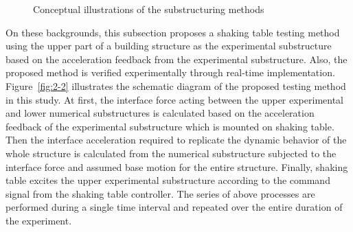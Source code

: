 \begin{figure}[ht]
\centering



\label{fig:2-1}
\caption{Conceptual illustrations of the substructuring methods}
\end{figure}

On these backgrounds, this subsection proposes a shaking table testing method using the upper part of a building structure as the experimental substructure based on the acceleration feedback from the experimental substructure. Also, the proposed method is verified experimentally through real-time implementation. Figure~\ref{fig:2-2} illustrates the schematic diagram of the proposed testing method in this study. At first, the interface force acting between the upper experimental and lower numerical substructures is calculated based on the acceleration feedback of the experimental substructure which is mounted on shaking table. Then the interface acceleration required to replicate the dynamic behavior of the whole structure is calculated from the numerical substructure subjected to the interface force and assumed base motion for the entire structure. Finally, shaking table excites the upper experimental substructure according to the command signal from the shaking table controller. The series of above processes are performed during a single time interval and repeated over the entire duration of the experiment.

